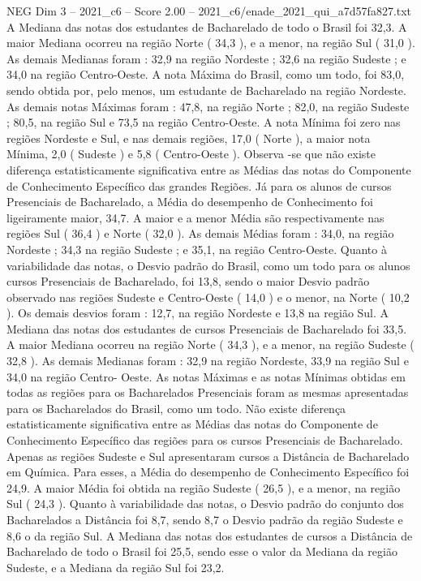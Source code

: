 \begin{textsample}{NEG Dim 3 – 2021\_c6 – Score 2.00 – 2021\_c6/enade\_2021\_qui\_a7d57fa827.txt}
A Mediana das notas dos estudantes de Bacharelado de todo o Brasil foi 32,3.
A maior Mediana ocorreu na região Norte ( 34,3 ), e a menor, na região Sul ( 31,0 ).
As demais Medianas foram : 32,9 na região Nordeste ; 32,6 na região Sudeste ; e 34,0 na região Centro-Oeste.
A nota Máxima do Brasil, como um todo, foi 83,0, sendo obtida por, pelo menos, um estudante de Bacharelado na região Nordeste.
As demais notas Máximas foram : 47,8, na região Norte ; 82,0, na região Sudeste ; 80,5, na região Sul e 73,5 na região Centro-Oeste.
A nota Mínima foi zero nas regiões Nordeste e Sul, e nas demais regiões, 17,0 ( Norte ), a maior nota Mínima, 2,0 ( Sudeste ) e 5,8 ( Centro-Oeste ).
Observa -se que não existe diferença estatisticamente significativa entre as Médias das notas do Componente de Conhecimento Específico das grandes Regiões.
Já para os alunos de cursos Presenciais de Bacharelado, a Média do desempenho de Conhecimento foi ligeiramente maior, 34,7.
A maior e a menor Média são respectivamente nas regiões Sul ( 36,4 ) e Norte ( 32,0 ).
As demais Médias foram : 34,0, na região Nordeste ; 34,3 na região Sudeste ; e 35,1, na região Centro-Oeste.
Quanto à variabilidade das notas, o Desvio padrão do Brasil, como um todo para os alunos cursos Presenciais de Bacharelado, foi 13,8, sendo o maior Desvio padrão observado nas regiões Sudeste e Centro-Oeste ( 14,0 ) e o menor, na Norte ( 10,2 ).
Os demais desvios foram : 12,7, na região Nordeste e 13,8 na região Sul.
A Mediana das notas dos estudantes de cursos Presenciais de Bacharelado foi 33,5.
A maior Mediana ocorreu na região Norte ( 34,3 ), e a menor, na região Sudeste ( 32,8 ).
As demais Medianas foram : 32,9 na região Nordeste, 33,9 na região Sul e 34,0 na região Centro- Oeste.
As notas Máximas e as notas Mínimas obtidas em todas as regiões para os Bacharelados Presenciais foram as mesmas apresentadas para os Bacharelados do Brasil, como um todo.
Não existe diferença estatisticamente significativa entre as Médias das notas do Componente de Conhecimento Específico das regiões para os cursos Presenciais de Bacharelado.
Apenas as regiões Sudeste e Sul apresentaram cursos a Distância de Bacharelado em Química.
Para esses, a Média do desempenho de Conhecimento Específico foi 24,9.
A maior Média foi obtida na região Sudeste ( 26,5 ), e a menor, na região Sul ( 24,3 ).
Quanto à variabilidade das notas, o Desvio padrão do conjunto dos Bacharelados a Distância foi 8,7, sendo 8,7 o Desvio padrão da região Sudeste e 8,6 o da região Sul.
A Mediana das notas dos estudantes de cursos a Distância de Bacharelado de todo o Brasil foi 25,5, sendo esse o valor da Mediana da região Sudeste, e a Mediana da região Sul foi 23,2.

\end{textsample}
